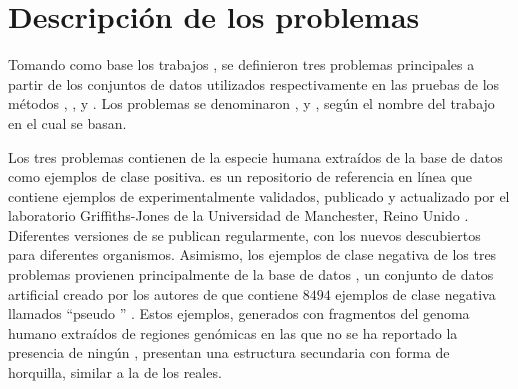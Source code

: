 %
%
%
\section{Descripción de los problemas}
%
Tomando como base los trabajos \cite{xue,ng,batuwita}, se definieron
tres problemas principales a partir de los conjuntos de datos
utilizados respectivamente en las pruebas de los métodos
\work{\tripletsvm}, \work{\mipred}, y \work{\micropred}.
Los problemas se denominaron \prob\tripletsvm{}, \prob{\mipred} y
\prob\micropred{}, según el nombre del trabajo en el cual se basan.

Los tres problemas contienen  de la especie humana
extraídos de la base de datos \dset\mirbase{} como ejemplos de clase
positiva.
\dset{\mirbase} es un repositorio de referencia en línea que contiene
ejemplos de  experimentalmente validados, publicado y
actualizado por el laboratorio Griffiths-Jones de la Universidad de
Manchester, Reino Unido \cite{mirbase1, mirbase2, mirbase3}.
Diferentes versiones de \work\mirbase{} se publican regularmente, con
los nuevos  descubiertos para diferentes organismos.
Asimismo, los ejemplos de clase negativa de los tres problemas
provienen principalmente de la base de datos , un
conjunto de datos artificial creado por los autores de
\work{\tripletsvm} que contiene $8494$ ejemplos de clase negativa
llamados ``pseudo '' \cite{xue}.
Estos ejemplos, generados con fragmentos del genoma humano extraídos
de regiones genómicas en las que no se ha reportado la presencia de
ningún \premirna{}, presentan una estructura secundaria con forma de
horquilla, similar a la de los  reales.
